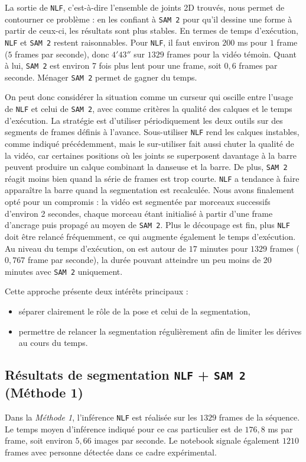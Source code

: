 \documentclass[11pt,a4paper]{article}
\begin{document}
La sortie de \texttt{NLF}, c'est-à-dire l'ensemble de joints 2D trouvés, nous permet de contourner ce problème : en les confiant à \texttt{SAM 2} pour qu'il dessine une forme à partir de ceux-ci, les résultats sont plus stables.
En termes de temps d'exécution, \texttt{NLF} et \texttt{SAM 2} restent raisonnables. Pour \texttt{NLF}, il faut environ $200$ ms pour $1$ frame ($5$ frames par seconde), donc $4'43''$ sur $1329$ frames pour la vidéo témoin.
Quant à lui, \texttt{SAM 2} est environ 7 fois plus lent pour une frame, soit $0{,}6$ frames par seconde. Ménager \texttt{SAM 2} permet de gagner du temps.

On peut donc considérer la situation comme un curseur qui oscille entre l'usage de \texttt{NLF} et celui de \texttt{SAM 2}, avec comme critères la qualité des calques et le temps d'exécution.
La stratégie est d'utiliser périodiquement les deux outils sur des segments de frames définis à l'avance.
Sous-utiliser \texttt{NLF} rend les calques instables, comme indiqué précédemment, mais le sur-utiliser fait aussi chuter la qualité de la vidéo, car certaines positions où les joints se superposent davantage à la barre peuvent produire un calque combinant la danseuse et la barre.
De plus, \texttt{SAM 2} réagit moins bien quand la série de frames est trop courte. \texttt{NLF} a tendance à faire apparaître la barre quand la segmentation est recalculée.
Nous avons finalement opté pour un compromis : la vidéo est segmentée par morceaux successifs d'environ 2 secondes, chaque morceau étant initialisé à partir d'une frame d'ancrage puis propagé au moyen de \texttt{SAM 2}.
Plus le découpage est fin, plus \texttt{NLF} doit être relancé fréquemment, ce qui augmente également le temps d'exécution.
Au niveau du temps d'exécution, on est autour de $17$ minutes pour $1329$ frames ($0{,}767$ frame par seconde), la durée pouvant atteindre un peu moins de $20$ minutes avec \texttt{SAM 2} uniquement.

Cette approche présente deux intérêts principaux :
\begin{itemize}
    \item séparer clairement le rôle de la pose et celui de la segmentation,
    \item permettre de relancer la segmentation régulièrement afin de limiter les dérives au cours du temps.
\end{itemize}

\subsection{Résultats de segmentation \texttt{NLF} + \texttt{SAM 2} (Méthode 1)}
Dans la \textit{Méthode 1}, l'inférence \texttt{NLF} est réalisée sur les $1329$ frames de la séquence.
Le temps moyen d'inférence indiqué pour ce cas particulier est de $176{,}8$ ms par frame, soit environ $5{,}66$ images par seconde.
Le notebook signale également $1210$ frames avec personne détectée dans ce cadre expérimental.
\end{document}
